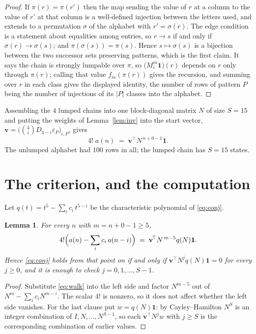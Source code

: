 \documentclass[11pt,a4paper]{article}
\theoremstyle{plain}
\newtheorem{lemma}[theorem]{Lemma}
\theoremstyle{definition}
\begin{document}
\begin{proof}
If $\pi(r)=\pi(r')$ then the map sending the value of $r$ at a column to the value of $r'$
at that column is a well-defined injection between the letters used, and extends to a
permutation $\sigma$ of the alphabet with $r'=\sigma(r)$. The edge condition is a statement
about equalities among entries, so $r\to s$ if and only if $\sigma(r)\to\sigma(s)$; and
$\pi(\sigma(s))=\pi(s)$. Hence $s\mapsto\sigma(s)$ is a bijection between the two successor
sets preserving patterns, which is the first claim. It says the chain is strongly lumpable
over $\pi$, so $\bigl(M_i^{m}\mathbf{1}\bigr)(r)$ depends on $r$ only through $\pi(r)$;
calling that value $f_m(\pi(r))$ gives the recursion, and summing over $r$ in each class
gives the displayed identity, the number of rows of pattern $P$ being the number of
injections of its $|P|$ classes into the alphabet.
\end{proof}

Assembling the $4$ lumped chains into one block-diagonal matrix $N$ of size $S=15$ and
putting the weights of Lemma~\ref{lem:inv} into the start vector,
$\mathbf{v}=\bigl(\binom{4}{i}D_{4-i}\varepsilon_P\bigr)_{i,P}$, gives
\begin{equation}\label{eq:walk}
4!\;a(n)\;=\;\mathbf{v}^{\!\top}N^{\,n+0-1}\mathbf{1} .
\end{equation}
The unlumped alphabet had $100$ rows in all; the lumped chain has $S=15$ states.

\section{The criterion, and the computation}

Let $q(t)=t^{5}-\sum_i c_i\,t^{5-i}$ be the characteristic polynomial of
\eqref{eq:conj}.

\begin{lemma}\label{lem:crit}
For every $n$ with $m=n+0-1\ge5$,
\[
4!\Bigl(a(n)-\sum_i c_i\,a(n-i)\Bigr)\;=\;\mathbf{v}^{\!\top}N^{\,m-5}q(N)\mathbf{1} .
\]
Hence \eqref{eq:conj} holds from that point on if and only if
$\mathbf{v}^{\!\top}N^{j}q(N)\mathbf{1}=0$ for every $j\ge0$, and it is enough to check
$j=0,1,\dots,S-1$.
\end{lemma}

\begin{proof}
Substitute \eqref{eq:walk} into the left side and factor $N^{m-5}$ out of
$N^{m}-\sum_i c_iN^{m-i}$. The scalar $4!$ is nonzero, so it does not affect whether
the left side vanishes. For the last clause put $w=q(N)\mathbf{1}$: by Cayley--Hamilton
$N^{S}$ is an integer combination of $I,N,\dots,N^{S-1}$, so each
$\mathbf{v}^{\!\top}N^{j}w$ with $j\ge S$ is the corresponding combination of earlier
values.
\end{proof}
\end{document}
